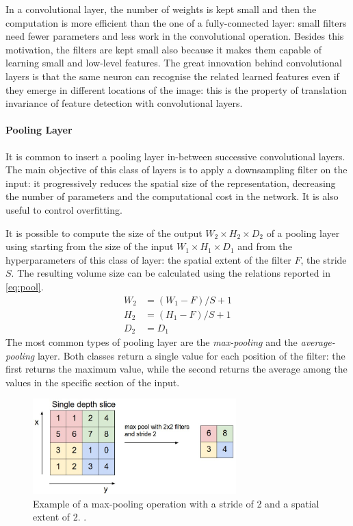 In a convolutional layer, the number of weights is kept small and then the computation is more efficient than the one of a fully-connected layer: small filters need fewer parameters and less work in the convolutional operation. Besides this motivation, the filters are kept small also because it makes them capable of learning small and low-level features. The great innovation behind convolutional layers is that the same neuron can recognise the related learned features even if they emerge in different locations of the image: this is the property of translation invariance of feature detection with convolutional layers.


\paragraph{Pooling Layer}

It is common to insert a pooling layer in-between successive convolutional layers. The main objective of this class of layers is to apply a downsampling filter on the input: it progressively reduces the spatial size of the representation, decreasing the number of parameters and the computational cost in the network. It is also useful to control overfitting.

It is possible to compute the size of the output $W_2 \times H_2 \times D_2$ of a pooling layer using starting from the size of the input $W_1 \times H_1 \times D_1$ and from the hyperparameters of this class of layer: the spatial extent of the filter $F$, the stride $S$. The resulting volume size can be calculated using the relations reported in \vref{eq:pool}.
\begin{equation} \label{eq:pool}
\begin{aligned}
W_2 &= (W_1 - F)/S + 1\\
H_2 &= (H_1 - F )/S + 1\\
D_2 &= D_1
\end{aligned}
\end{equation}
The most common types of pooling layer are the \textit{max-pooling} and the \textit{average-pooling} layer. Both classes return a single value for each position of the filter: the first returns the maximum value, while the second returns the average among the values in the specific section of the input.



\begin{figure}[!h]
	\centering
	\includegraphics[width=0.7\textwidth]{img/maxpool.jpeg}
	\caption{\small Example of a max-pooling operation with a stride of 2 and a spatial extent of 2. \cite{stanford2019cs231n}.}
	\label{fig:avgpool}
\end{figure}

